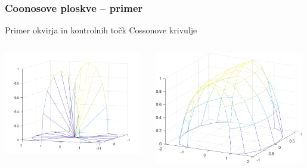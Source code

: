 \documentclass{beamer}
\begin{document}
\begin{frame}
    \frametitle{Coonosove ploskve -- primer}
    Primer okvirja in kontrolnih točk Cossonove krivulje
	\begin{columns}[c]
		\begin{column}{0.5\textwidth}
			\includegraphics[width=0.98\textwidth]{ogrodje.png}
		\end{column}
		\begin{column}{0.5\textwidth}
			\includegraphics[width=0.98\textwidth]{dodatne_kont_t.png}
		\end{column}
	\end{columns}
\end{frame}
\end{document}
